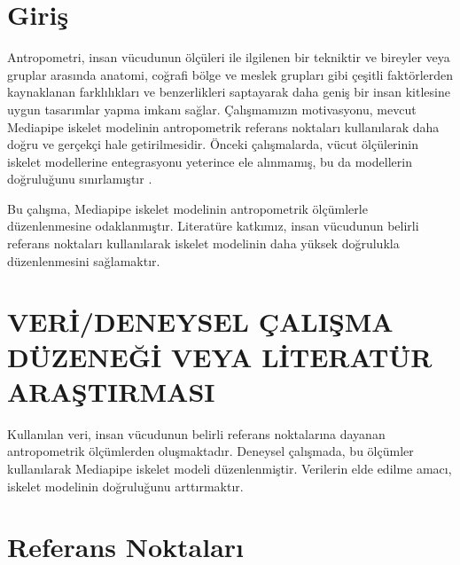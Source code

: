 \documentclass[12pt, a4paper]{article}
\begin{document}
\section{Giriş}
Antropometri, insan vücudunun ölçüleri ile ilgilenen bir tekniktir ve bireyler veya gruplar arasında anatomi, coğrafi bölge ve meslek grupları gibi çeşitli faktörlerden kaynaklanan farklılıkları ve benzerlikleri saptayarak daha geniş bir insan kitlesine uygun tasarımlar yapma imkanı sağlar. Çalışmamızın motivasyonu, mevcut Mediapipe iskelet modelinin antropometrik referans noktaları kullanılarak daha doğru ve gerçekçi hale getirilmesidir. Önceki çalışmalarda, vücut ölçülerinin iskelet modellerine entegrasyonu yeterince ele alınmamış, bu da modellerin doğruluğunu sınırlamıştır \cite{Antropometrik}.

Bu çalışma, Mediapipe iskelet modelinin antropometrik ölçümlerle düzenlenmesine odaklanmıştır. Literatüre katkımız, insan vücudunun belirli referans noktaları kullanılarak iskelet modelinin daha yüksek doğrulukla düzenlenmesini sağlamaktır.
\section{VERİ/DENEYSEL ÇALIŞMA DÜZENEĞİ VEYA LİTERATÜR ARAŞTIRMASI}
Kullanılan veri, insan vücudunun belirli referans noktalarına dayanan antropometrik ölçümlerden oluşmaktadır. Deneysel çalışmada, bu ölçümler kullanılarak Mediapipe iskelet modeli düzenlenmiştir. Verilerin elde edilme amacı, iskelet modelinin doğruluğunu arttırmaktır\cite{Antropometrik}.
 \section{Referans Noktaları}
\end{document}
